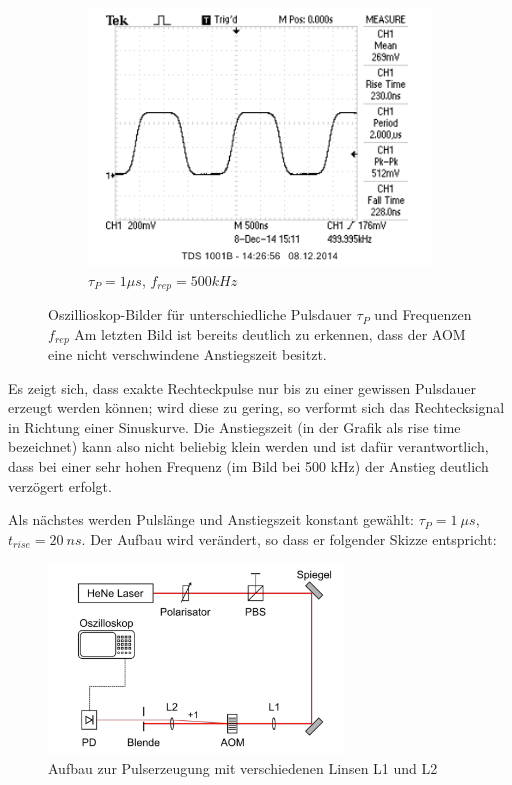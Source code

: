 \documentclass[bigchapter,colorback,accentcolor=tud4b,linedtoc,11pt]{tudreport}
\begin{document}
\begin{figure}[H]
\begin{subfigure}[h]{0.3\textwidth}
    \includegraphics[width=\textwidth]{data/Aufgabe5/500kHz-1us.png}
    \caption[Cap for listoffigures]{$\tau_P = 1\mu s$, $f_{rep} = 500kHz$}
    \label{fig:500kHz1ys}
  \end{subfigure}
  \caption{Oszillioskop-Bilder für unterschiedliche Pulsdauer $\tau_P$ und Frequenzen $f_{rep}$ Am letzten Bild ist bereits deutlich zu erkennen, dass der AOM eine nicht verschwindene Anstiegszeit besitzt.}\label{fig:nolenspulses}
\end{figure}

Es zeigt sich, dass exakte Rechteckpulse nur bis zu einer gewissen Pulsdauer erzeugt werden können; wird diese zu gering, so verformt sich das Rechtecksignal in Richtung einer Sinuskurve. Die Anstiegszeit (in der Grafik als rise time bezeichnet) kann also nicht beliebig klein werden und ist dafür verantwortlich, dass bei einer sehr hohen Frequenz (im Bild bei 500 kHz) der Anstieg deutlich verzögert erfolgt.

Als nächstes werden Pulslänge und Anstiegszeit konstant gewählt: $\tau_P = 1~\mu s$, $t_{rise} = 20~ns$. Der Aufbau wird verändert, so dass er folgender Skizze entspricht:

\begin{figure}[H] 
  \centering
     \includegraphics[width=0.7\textwidth]{img/pulserzeugung.jpg}
  \caption[Cap for listoffigures]{Aufbau zur Pulserzeugung mit verschiedenen Linsen L1 und L2 \cite{Anleitung}}
  \label{fig:Bild2}
\end{figure}
\FloatBarrier
\end{document}
